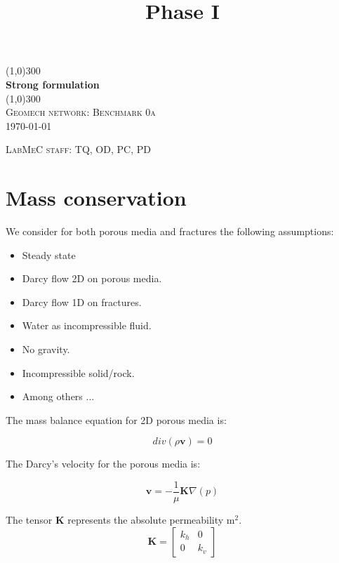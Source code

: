 \documentclass{article}
\title{Phase I}
\begin{document}
\begin{titlepage}
	\begin{center}
    \line(1,0){300}\\
    [0.65cm]
	\huge{\bfseries Strong formulation}\\
	\line(1,0){300}\\
	\textsc{\Large Geomech network: Benchmark 0a}\\
	\textsc{\LARGE \today}\\
	[5.5cm]     
	\end{center}
	\begin{flushright}
		\textsc{\Large LabMeC staff: TQ, OD, PC, PD}\\
		[0.5cm]
	\end{flushright}
\end{titlepage}

\section{Mass conservation}

We consider for both porous media and fractures the following assumptions:

\begin{itemize}
\item Steady state
\item Darcy flow 2D on porous media.
\item Darcy flow 1D on fractures.
\item Water as incompressible fluid.
\item No gravity.
\item Incompressible solid/rock.
\item Among others ...
\end{itemize}


The mass balance equation for 2D porous media is:

\begin{equation}
div\left(\rho\mathbf{v}\right)=0
\end{equation}

The Darcy's velocity for the porous media is:

\begin{equation}
\mathbf{v}=-\frac{1}{\mu}\mathbf{K}\nabla\left(p\right)
\end{equation}

The tensor $\mathbf{K}$ represents the absolute permeability $\si{\square\metre}$.
\begin{equation}
\mathbf{K}=\left[\begin{array}{cc}
k_{h} & 0\\
0 & k_{v}
\end{array}\right]
\end{equation}
\end{document}
